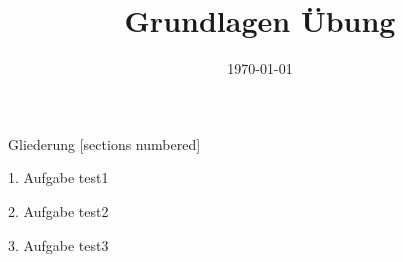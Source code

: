 



\title{Grundlagen Übung}
\date{\today}




\maketitle

\begin{frame}{Gliederung}
	[sections numbered]
	\tableofcontents
\end{frame}



\begin{frame}{1. Aufgabe}
	test1
\end{frame}

\begin{frame}{2. Aufgabe}
	test2
\end{frame}

\begin{frame}{3. Aufgabe}
	test3
\end{frame}



